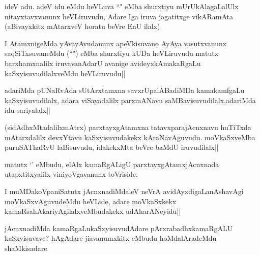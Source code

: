 
\begin{artha}
ideV adu. adeV idu eMdu heVLuva ``\stext" eMba shurxtiyu mUrUkAlagaLalUlx nitayxtavxvanunx heVLiruvudu, Adare Iga iruva jagatitxge vikARamAta (aBivayxkitx mAtarxveV horatu beVre EnU ilalx)
\end{artha}

\begin{artha}
I AtamxnigeMda yAvayAvudanunx apeVkisuvano AyAya vasutxvanunx saqSiTxsuvaneMdu (``\stext") eMba shurxtiyu kUDa heVLiruvudu matutx barxhamxnalilx iruvavanAdarU avanige avideyxkAmakaRgaLu kaSxyisuvudilalxveMdu heVLiruvudu||
\end{artha}


\begin{artha}
adariMda pUNaRvAda sUtArxtamxna savxrUpalABadiMDa kamakamfgaLu kaSxyisuvudilalx, adara viSayadalilx parxmANavu saMBavisuvudilalx,adariMda idu sariyalalx||
\end{artha}


\begin{artha}
(sidAdhxMtadalilxmAtrx) parxtayxgAtamxna tatavxparajAcnxnavu huTiTxda mAtarxdalilx devxYtavu kaSxyisuvudakekx kAraNavAguvudu. moVkaSxveMba puruSAThaRvU laBisuvudu, idakekxMta beVre baMdU iruvudilalx||
\end{artha}

\begin{artha}
matutx `\stext' eMbudu, elAlx kamaRgALigU parxtayxgAtamxjAcnxnada utapxtitxyalilx viniyoVgavanunx toVriside.
\end{artha}

\begin{artha}
I muMDakoVpaniSatutx jAcnxnadiMdaleV neVrA avidAyxdigaLanAshavAgi moVkaSxvAguvudeMdu heVLide, adare moVkaSxkekx kamaRsahAkariyAgilalxveMbudakekx udAharANeyidu||
\end{artha}

\begin{artha}
jAcnxnadiMda kamaRgaLukaSxyisuvudAdare pArxrabadhxkamaRgALU kaSxyisuvave? hAgAdare jiavanumxkitx eMbudu hoMdalAradeMdu shaMkisadare
\end{artha}


